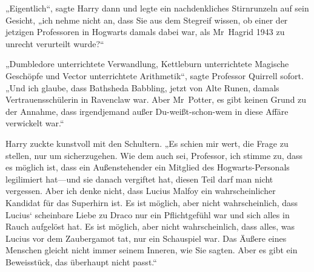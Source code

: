 „Eigentlich“, sagte Harry dann und legte ein nachdenkliches Stirnrunzeln auf sein Gesicht, „ich nehme nicht an, dass Sie aus dem Stegreif wissen, ob einer der jetzigen Professoren in Hogwarts damals dabei war, als Mr~Hagrid 1943 zu unrecht verurteilt wurde?“

„Dumbledore unterrichtete Verwandlung, Kettleburn unterrichtete Magische Geschöpfe und Vector unterrichtete Arithmetik“, sagte Professor Quirrell sofort. „Und ich glaube, dass Bathsheda Babbling, jetzt von Alte Runen, damals Vertrauensschülerin in Ravenclaw war. Aber Mr~Potter, es gibt keinen Grund zu der Annahme, dass irgendjemand außer Du-weißt-schon-wem in diese Affäre verwickelt war.“

Harry zuckte kunstvoll mit den Schultern. „Es schien mir wert, die Frage zu stellen, nur um sicherzugehen. Wie dem auch sei, Professor, ich stimme zu, dass es möglich ist, dass ein Außenstehender ein Mitglied des Hogwarts-Personals legilimiert hat—und sie danach vergiftet hat, diesen Teil darf man nicht vergessen. Aber ich denke nicht, dass Lucius Malfoy ein wahrscheinlicher Kandidat für das Superhirn ist. Es ist möglich, aber nicht wahrscheinlich, dass Lucius‘ scheinbare Liebe zu Draco nur ein Pflichtgefühl war und sich alles in Rauch aufgelöst hat. Es ist möglich, aber nicht wahrscheinlich, dass alles, was Lucius vor dem Zaubergamot tat, nur ein Schauspiel war. Das Äußere eines Menschen gleicht nicht immer seinem Inneren, wie Sie sagten. Aber es gibt ein Beweisstück, das überhaupt nicht passt.“

